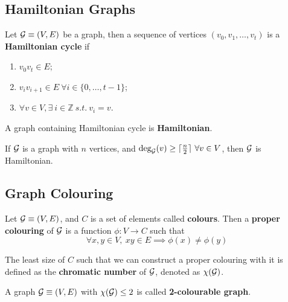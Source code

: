 \documentclass{article}
\def\Z{{\mathbb Z}}
\begin{document}
		\subsection{Hamiltonian Graphs}
			\begin{definition}
				Let $\mathcal{{G}} \equiv (V, E)$ be a graph, then a sequence of vertices $(v_0, v_1, \dots, v_t)$ is a \textbf{Hamiltonian cycle} if 
				\begin{enumerate}
					\item $v_0 v_t \in E$;
					\item $v_i v_{i+1} \in E\ \forall i \in \{0, \dots, t-1\}$;
					\item $\forall v \in V, \exists\ i \in \Z\ s.t.\ v_i = v$.
				\end{enumerate}
			\end{definition}
			
			\begin{definition}
				A graph containing Hamiltonian cycle is \textbf{Hamiltonian}.
			\end{definition}
			
			\begin{theorem}
				If $\mathcal{{G}}$ is a graph with $n$ vertices, and $\text{{deg}}_{\mathcal{{G}}}(v) \geq \lceil \frac{n}{2} \rceil\ \forall v \in V$, then $\mathcal{{G}}$ is Hamiltonian.
			\end{theorem}
			
		\subsection{Graph Colouring}
			\begin{definition}
				Let $\mathcal{{G}} \equiv (V, E)$, and $C$ is a set of elements called \textbf{colours}. Then a \textbf{proper colouring} of $\mathcal{{G}}$ is a function $\phi:V \to C$ such that 
				\begin{equation}
					\forall x, y \in V,\ xy \in E \implies \phi(x) \neq \phi(y)
				\end{equation}
			\end{definition}
			
			\begin{definition}
				The least size of $C$ such that we can construct a proper colouring with it is defined as the \textbf{chromatic number} of $\mathcal{{G}}$, denoted as $\chi(\mathcal{{G}})$.
			\end{definition}
			
			\begin{definition}
				A graph $\mathcal{{G}} \equiv (V, E)$ with $\chi(\mathcal{{G}}) \leq 2$ is called \textbf{2-colourable graph}.
			\end{definition}
			
\end{document}
